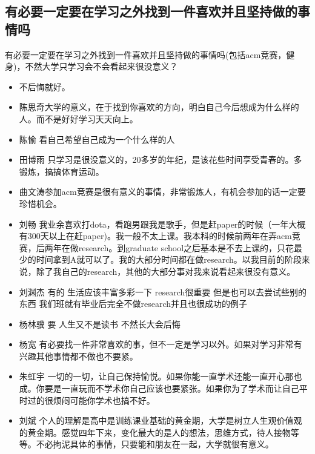 \documentclass{vivid_layout}
\begin{document}
\subsection{有必要一定要在学习之外找到一件喜欢并且坚持做的事情吗}
有必要一定要在学习之外找到一件喜欢并且坚持做的事情吗(包括acm竞赛，健身)，不然大学只学习会不会看起来很没意义？
\begin{itemize}
\item 不后悔就好。
\item { 陈思奇}\quad 大学的意义，在于找到你喜欢的方向，明白自己今后想成为什么样的人。而不是好好学习天天向上。
\item { 陈愉}  \quad 看自己希望自己成为一个什么样的人
\item  { 田博雨}  \quad 只学习是很没意义的，20多岁的年纪，是该花些时间享受青春的。多锻炼，搞搞体育运动。
\item { 曲文涛}\quad 参加acm竞赛是很有意义的事情，非常锻炼人，有机会参加的话一定要珍惜机会。
\item  { 刘畅}  \quad 我业余喜欢打dota，看跑男跟我是歌手，但是赶paper的时候（一年大概有300天以上在赶paper)。我一般不太上课。我本科的时候前两年在弄acm竞赛，后两年在做research。到graduate school之后基本是不去上课的，只花最少的时间拿到A就可以了。我的大部分时间都在做research。以我目前的阶段来说，除了我自己的research，其他的大部分事对我来说看起来很没有意义。
\item  { 刘渊杰}  \quad 有的 生活应该丰富多彩一下 research很重要 但是也可以去尝试些别的东西 我们班就有毕业后完全不做research并且也很成功的例子
\item  { 杨林骥}  \quad 要 人生又不是读书 不然长大会后悔
\item  { 杨宽}  \quad 有必要找一件非常喜欢的事，但不一定是学习以外。如果对学习非常有兴趣其他事情都不做也不要紧。
\item  { 朱虹宇}  \quad 一切的一切，让自己保持愉悦。如果你能一直学术还能一直开心那也成。你要是一直玩而不学术你自己应该也要紧张。如果你为了学术而让自己平时过的很烦闷可能你学术也搞不好。
\item  { 刘斌}  \quad 个人的理解是高中是训练课业基础的黄金期，大学是树立人生观价值观的黄金期。感觉四年下来，变化最大的是人的想法，思维方式，待人接物等等。不必拘泥具体的事情，只要能和朋友在一起，大学就很有意义。
\end{itemize}
\end{document}
